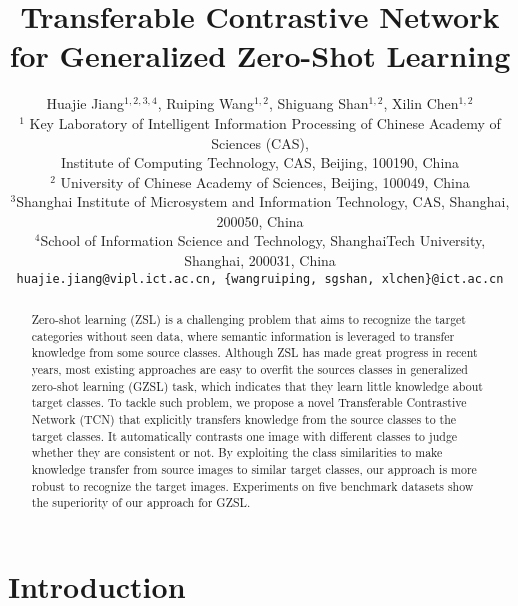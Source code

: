 \documentclass[10pt,twocolumn,letterpaper]{article}
\begin{document}
\title{Transferable Contrastive Network for Generalized Zero-Shot Learning}

\author{Huajie Jiang$^{1,2,3,4}$, Ruiping Wang$^{1,2}$, Shiguang Shan$^{1,2}$, Xilin Chen$^{1,2}$\\
$^{1}$ Key Laboratory of Intelligent Information Processing of Chinese Academy of Sciences (CAS),\\
Institute of Computing Technology, CAS, Beijing, 100190, China\\
$^{2}$ University of Chinese Academy of Sciences, Beijing, 100049, China\\
$^3$Shanghai Institute of Microsystem and Information Technology, CAS, Shanghai, 200050, China\\
$^4$School of Information Science and Technology, ShanghaiTech University, Shanghai, 200031, China\\
{\tt\small huajie.jiang@vipl.ict.ac.cn, \{wangruiping, sgshan, xlchen\}@ict.ac.cn}
}

\maketitle
\ificcvfinal\thispagestyle{empty}\fi


\begin{abstract}
Zero-shot learning (ZSL) is a challenging problem that aims to recognize the target categories without seen data, where semantic information is leveraged to transfer knowledge from some source classes. Although ZSL has made great progress in recent years, most existing approaches are easy to overfit the sources classes in generalized zero-shot learning (GZSL) task, which indicates that they learn little knowledge about target classes. To tackle such problem,  we propose a novel Transferable Contrastive Network (TCN) that explicitly transfers knowledge from the source classes to the target classes. It automatically contrasts one image with different classes to judge whether they are consistent or not. By exploiting the class similarities to make knowledge transfer from source images to similar target classes, our approach is more robust to recognize the target images. Experiments on five benchmark datasets show the superiority of our approach for GZSL.
\end{abstract}

\section{Introduction}
\end{document}
